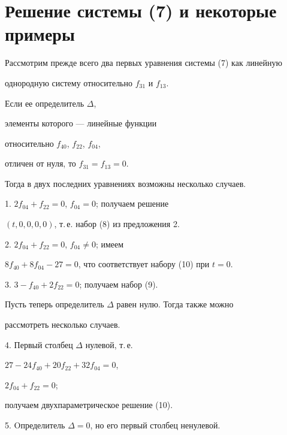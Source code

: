 \section{Решение системы (7) и некоторые примеры}





Рассмотрим прежде всего два первых уравнения системы (7) как линейную


однородную систему относительно $f_{31}$ и $f_{13}$.





Если ее определитель $\Delta$,


элементы которого --- линейные функции 


относительно $f_{40}$, $f_{22}$, $f_{04}$,


отличен от нуля, то $f_{31}=f_{13}=0$.


Тогда в двух последних уравнениях возможны несколько случаев.





1. $2 f_{04}+f_{22}=0$, $f_{04}=0$; получаем решение


$(t, 0, 0, 0, 0)$, т.\,е. набор (8) из предложения 2.





2. $2 f_{04}+f_{22}=0$, $f_{04} \ne 0$; имеем


$8 f_{40}+8 f_{04} - 27=0$, что соответствует набору (10) при $t=0$.





3. $3 - f_{40}+2 f_{22}=0$; получаем набор (9).





\noindent{}Пусть теперь определитель $\Delta$ равен нулю. Тогда также можно


рассмотреть несколько случаев.





4. Первый столбец $\Delta$ нулевой, т.\,е.


$27 - 24 f_{40}+20 f_{22}+32 f_{04}=0$,


$2 f_{04}+f_{22}=0$;


получаем двухпараметрическое решение (10).





5. Oпределитель $\Delta=0$, но его первый столбец ненулевой.


